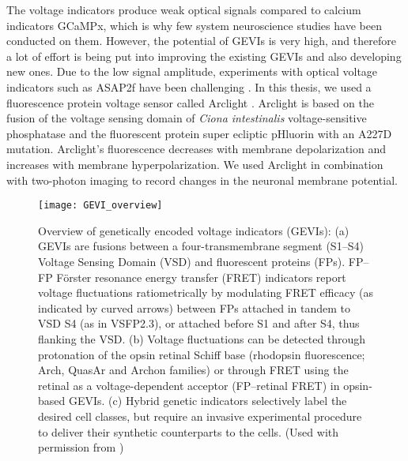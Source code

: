 The voltage indicators produce weak optical signals compared to calcium indicators GCaMPx, which is why few system neuroscience studies have been conducted on them. However, the potential of GEVIs is very high, and therefore a lot of effort is being put into improving the existing GEVIs and also developing new ones. Due to the low signal amplitude, experiments with optical voltage indicators such as ASAP2f have been challenging \parencite{Yang2016}. In this thesis, we used a fluorescence protein voltage sensor called Arclight \parencite{Jin2012}. Arclight is based on the fusion of the voltage sensing domain of \textit{Ciona intestinalis} voltage-sensitive phosphatase \parencite{Murata2005} and the fluorescent protein super ecliptic pHluorin with an A227D mutation. Arclight's fluorescence decreases with membrane depolarization and increases with membrane hyperpolarization. We used Arclight in combination with two-photon imaging to record changes in the neuronal membrane potential.

\begin{figure}
\centering
\hspace*{-1cm} 
\texttt{[image: GEVI\_overview]}
\caption[Overview of genetically encoded voltage indicators (GEVIs)] {Overview of genetically encoded voltage indicators (GEVIs): (a) GEVIs are fusions between a four-transmembrane segment (S1–S4) Voltage Sensing Domain (VSD) and fluorescent proteins (FPs). FP–FP Förster resonance energy transfer (FRET) indicators report voltage fluctuations ratiometrically by modulating FRET efficacy (as indicated by curved arrows) between FPs attached in tandem to VSD S4 (as in VSFP2.3), or attached before S1 and after S4, thus flanking the VSD. (b) Voltage fluctuations can be detected through protonation of the opsin retinal Schiff base (rhodopsin fluorescence; Arch, QuasAr and Archon families) or through FRET using the retinal as a voltage-dependent acceptor (FP–retinal FRET) in opsin-based GEVIs. (c) Hybrid genetic indicators selectively label the desired cell classes, but require an invasive experimental procedure to deliver their synthetic counterparts to the cells. (Used with permission from \parencite{Knopfel2019})} 
\label{fig:voltageindicators}
\end{figure}

